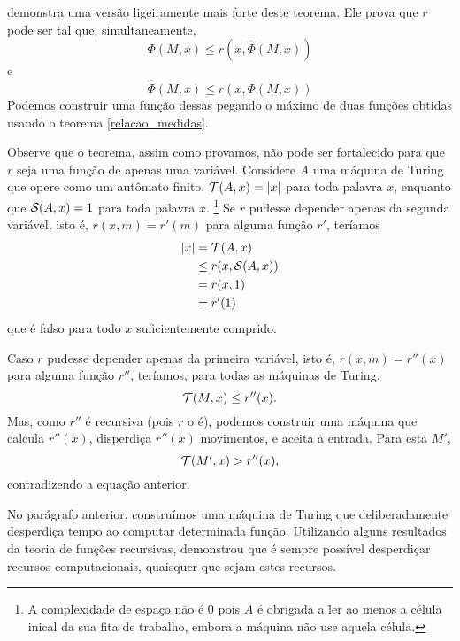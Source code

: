  demonstra uma versão ligeiramente mais forte
deste teorema.
Ele prova que $r$ pode ser tal que,
simultaneamente,
\begin{equation*}
    \Phi(M, x) \leq r( x, \hat \Phi(M, x))
\end{equation*}
e
\begin{equation*}
    \hat \Phi(M, x) \leq r( x, \Phi(M, x))
\end{equation*}
Podemos construir uma função dessas
pegando o máximo de duas funções obtidas
usando o teorema \ref{relacao_medidas}.

Observe que o teorema,
assim como provamos,
não pode ser fortalecido
para que $r$ seja uma função de apenas uma variável.
Considere $A$ uma máquina de Turing
que opere como um autômato finito.
${\mathcal{T}}(A, x) = |x|$ para toda palavra $x$,
enquanto que ${\mathcal{S}}(A, x) = 1$ para toda palavra $x$.
\footnote{
    A complexidade de espaço não é $0$
    pois $A$ é obrigada a ler
    ao menos a célula inical da sua fita de trabalho,
    embora a máquina não use aquela célula.
}
Se $r$ pudesse depender apenas da segunda variável,
isto é, $r(x, m) = r'(m)$ para alguma função $r'$,
teríamos
\begin{align*}
    |x| &= {\mathcal{T}}(A, x) \\
        &\leq r(x, {\mathcal{S}}(A, x)) \\
        &= r(x, 1) \\
        &= r'(1)
\end{align*}
que é falso para todo $x$ suficientemente comprido.

Caso $r$ pudesse depender apenas da primeira variável,
isto é, $r(x, m) = r''(x)$ para alguma função $r''$,
teríamos, para todas as máquinas de Turing,
\begin{equation*}
    {\mathcal{T}}(M, x) \leq r''(x).
\end{equation*}
Mas, como $r''$ é recursiva
(pois $r$ o é),
podemos construir uma máquina que calcula $r''(x)$,
disperdiça $r''(x)$ movimentos,
e aceita a entrada.
Para esta $M'$,
\begin{equation*}
    {\mathcal{T}}(M', x) > r''(x),
\end{equation*}
contradizendo a equação anterior.

No parágrafo anterior,
construímos uma máquina de Turing
que deliberadamente desperdiça tempo
ao computar determinada função.
Utilizando alguns resultados da teoria de funções recursivas,
 demonstrou que
é sempre possível desperdiçar recursos computacionais,
quaisquer que sejam estes recursos.

